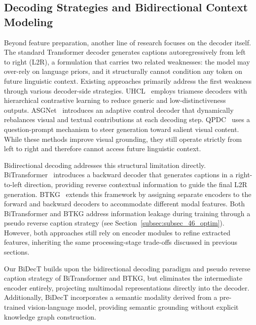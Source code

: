 \subsection{Decoding Strategies and Bidirectional Context Modeling}

Beyond feature preparation, another line of research focuses on the decoder itself. The standard Transformer decoder generates captions autoregressively from left to right (L2R), a formulation that carries two related weaknesses: the model may over-rely on language priors, and it structurally cannot condition any token on future linguistic context. Existing approaches primarily address the first weakness through various decoder-side strategies. UHCL~\cite{sunUnifiedHierarchicalContrastive2026} employs triamese decoders with hierarchical contrastive learning to reduce generic and low-distinctiveness outputs. ASGNet~\cite{liuAdaptiveSemanticGuidance2025} introduces an adaptive control decoder that dynamically rebalances visual and textual contributions at each decoding step. QPDC~\cite{chenAskFocusMore2026} uses a question-prompt mechanism to steer generation toward salient visual content. While these methods improve visual grounding, they still operate strictly from left to right and therefore cannot access future linguistic context.

Bidirectional decoding addresses this structural limitation directly. BiTransformer~\cite{zhongBiTransformerAugmentingSemantic2022} introduces a backward decoder that generates captions in a right-to-left direction, providing reverse contextual information to guide the final L2R generation. BTKG~\cite{zhongBidirectionalTransformerKnowledge2024} extends this framework by assigning separate encoders to the forward and backward decoders to accommodate different modal features. Both BiTransformer and BTKG address information leakage during training through a pseudo reverse caption strategy (see Section~\ref{subsec:subsec_46_optim}). However, both approaches still rely on encoder modules to refine extracted features, inheriting the same processing-stage trade-offs discussed in previous sections.

Our BiDecT builds upon the bidirectional decoding paradigm and pseudo reverse caption strategy of BiTransformer and BTKG, but eliminates the intermediate encoder entirely, projecting multimodal representations directly into the decoder. Additionally, BiDecT incorporates a semantic modality derived from a pre-trained vision-language model, providing semantic grounding without explicit knowledge graph construction.
